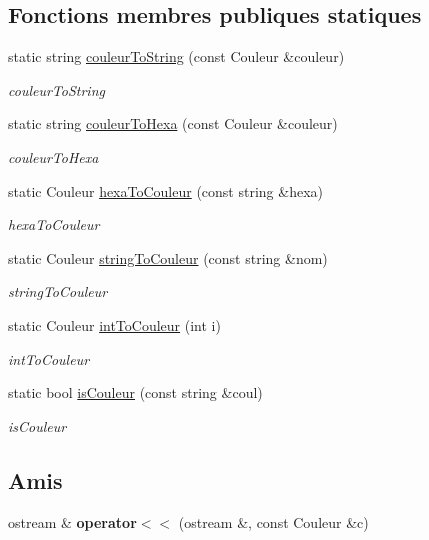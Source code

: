 \subsection*{Fonctions membres publiques statiques}
\begin{DoxyCompactItemize}
\item 
static string \hyperlink{class_couleurs_a3a07aadeec400f7ae9aa2f7548732609}{couleur\+To\+String} (const Couleur \&couleur)
\begin{DoxyCompactList}\small\item\em couleur\+To\+String \end{DoxyCompactList}\item 
static string \hyperlink{class_couleurs_a180a77b65f68f5bfa07c7bf0755cced8}{couleur\+To\+Hexa} (const Couleur \&couleur)
\begin{DoxyCompactList}\small\item\em couleur\+To\+Hexa \end{DoxyCompactList}\item 
static Couleur \hyperlink{class_couleurs_a502cfe3fdf9496d4b2f391d68b3ec00f}{hexa\+To\+Couleur} (const string \&hexa)
\begin{DoxyCompactList}\small\item\em hexa\+To\+Couleur \end{DoxyCompactList}\item 
static Couleur \hyperlink{class_couleurs_a4c1d1a7dad74a2337920103313c7ddbc}{string\+To\+Couleur} (const string \&nom)
\begin{DoxyCompactList}\small\item\em string\+To\+Couleur \end{DoxyCompactList}\item 
static Couleur \hyperlink{class_couleurs_ade385a32c027d77eef94fff699e23ac4}{int\+To\+Couleur} (int i)
\begin{DoxyCompactList}\small\item\em int\+To\+Couleur \end{DoxyCompactList}\item 
static bool \hyperlink{class_couleurs_aa9b1467aaf1b88acbefc3e319a9a32bf}{is\+Couleur} (const string \&coul)
\begin{DoxyCompactList}\small\item\em is\+Couleur \end{DoxyCompactList}\end{DoxyCompactItemize}
\subsection*{Amis}
\begin{DoxyCompactItemize}
\item 
\hypertarget{class_couleurs_acad36b0faad1100a0bf903291f8506db}{ostream \& {\bfseries operator$<$$<$} (ostream \&, const Couleur \&c)}\label{class_couleurs_acad36b0faad1100a0bf903291f8506db}

\end{DoxyCompactItemize}


